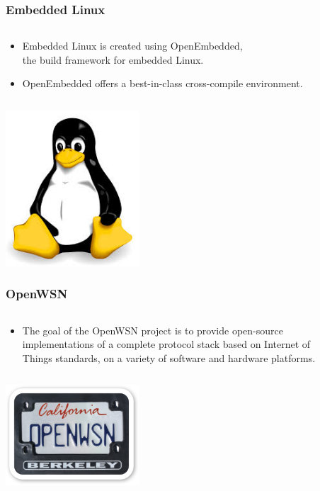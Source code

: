 \documentclass{beamer}
\begin{document}
\begin{frame}
	\frametitle{Embedded Linux}
	\begin{columns}[c]
		\begin{column}{30cm}
			\vspace{.1cm}
			\begin{itemize}
				\justifying
				\item Embedded Linux is created using OpenEmbedded,\\
				the build framework for embedded Linux.
				\item OpenEmbedded offers a best-in-class cross-compile environment.
			\end{itemize}
		\end{column}
	\end{columns}
	\vspace{.5cm}
	\hspace*{5.5cm} \includegraphics[width=5cm]{figs/linux-logo.jpeg}
\end{frame}

\begin{frame}
	\frametitle{OpenWSN}
	\begin{columns}[c]
		\begin{column}{30cm}
			\vspace{.1cm}
			\begin{itemize}
				\justifying
				\item The goal of the OpenWSN project is to provide open-source\\
				implementations of a complete protocol stack based on Internet of\\
				Things standards, on a variety of software and hardware platforms.
			\end{itemize}
		\end{column}
	\end{columns}
	\vspace{.5cm}
	\hspace*{5.5cm} \includegraphics[width=5cm]{figs/openwsn-logo.png}
\end{frame}
\end{document}

